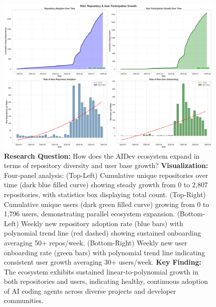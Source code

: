 \documentclass[11pt]{article}
\begin{document}
\begin{figure}[H]
\centering
\includegraphics[width=\textwidth]{figures/temporal_03_repo_user_growth.png}
\caption{\textbf{Research Question:} How does the AIDev ecosystem expand in terms of repository diversity and user base growth? \textbf{Visualization:} Four-panel analysis: (Top-Left) Cumulative unique repositories over time (dark blue filled curve) showing steady growth from 0 to 2,807 repositories, with statistics box displaying total count. (Top-Right) Cumulative unique users (dark green filled curve) growing from 0 to 1,796 users, demonstrating parallel ecosystem expansion. (Bottom-Left) Weekly new repository adoption rate (blue bars) with polynomial trend line (red dashed) showing sustained onboarding averaging 50+ repos/week. (Bottom-Right) Weekly new user onboarding rate (green bars) with polynomial trend line indicating consistent user growth averaging 30+ users/week. \textbf{Key Finding:} The ecosystem exhibits sustained linear-to-polynomial growth in both repositories and users, indicating healthy, continuous adoption of AI coding agents across diverse projects and developer communities.}
\label{fig:temporal_repo_user}
\end{figure}
\end{document}
